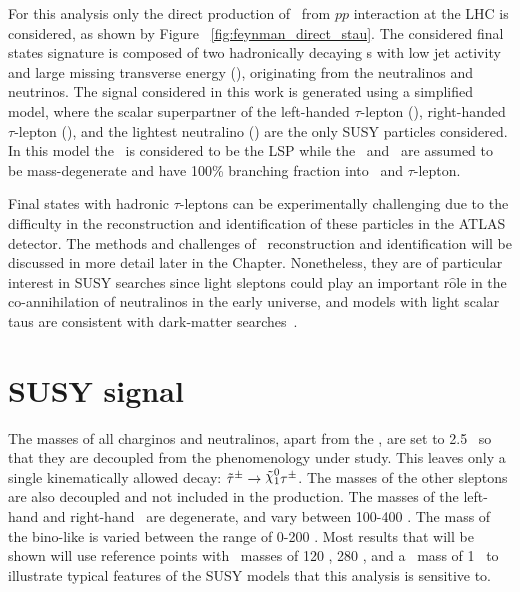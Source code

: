 	
	For this analysis only the direct production of \stau\ from $pp$ interaction at the \ac{LHC} is considered, as shown by Figure ~\ref{fig:feynman_direct_stau}. The considered final states signature is composed of two hadronically decaying \ltau s with low jet activity and large missing transverse energy (\met), originating from the neutralinos and neutrinos.	
	The signal considered in this work is generated using a simplified model, where the scalar superpartner of the left-handed $\tau$-lepton (\stauL), right-handed $\tau$-lepton  (\stauR), and the lightest neutralino (\ninoone) are the only \ac{SUSY} particles considered. 
	In this model the \ninoone\ is considered to be the \ac{LSP} while the \stauL\ and \stauR\ are assumed to be mass-degenerate and have 100\% branching fraction into \ninoone\ and $\tau$-lepton.
	 
	
	\FeynmanDiagramStau 
		 
	Final states with hadronic $\tau$-leptons can be experimentally challenging due to the difficulty in the reconstruction and identification of these particles in the \ac{ATLAS} detector. The methods and challenges of \ltau\ reconstruction and identification will be discussed in more detail later in the Chapter.
	Nonetheless, they are of particular interest in \ac{SUSY} searches since light sleptons could play an important r$\mathrm{\hat{o}}$le in the co-annihilation of neutralinos in the early universe, and models with light scalar taus are consistent with dark-matter searches~\cite{Albornoz_V_squez_2011}.  
	 
	\section{SUSY signal}
	\label{sec:susysig}
	The masses of all charginos and neutralinos, apart from the \ninoone, are set to 2.5 \tev\ so that they are decoupled from the phenomenology under study. 
	This leaves only a single kinematically allowed decay: $\stau^{\pm}\rightarrow\ninoone\tau^{\pm}$.  
	The masses of the other sleptons are also decoupled and not included in the production. 
	The masses of the left-hand and right-hand \stau\ are degenerate, and vary between 100-400 \gev. The mass of the bino-like \ninoone is varied between the range of 0-200 \gev.
	Most results that will be shown will use reference points with \stau\ masses of 120 \gev, 280 \gev, and a \ninoone\ mass of 1 \gev\ to illustrate typical features of the \ac{SUSY} models that this analysis is sensitive to.
	
